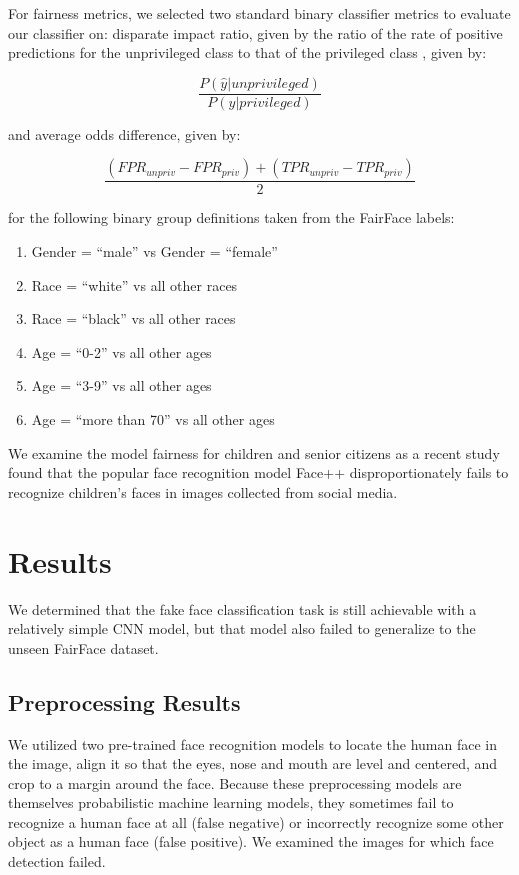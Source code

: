 \documentclass[11pt, letterpaper]{article}
\providecommand{\tightlist}{%
  \setlength{\itemsep}{0pt}\setlength{\parskip}{0pt}
}
\begin{document}
\begin{multicols}{2}
  For fairness metrics, we selected two standard binary classifier
  metrics to evaluate our classifier on: disparate impact ratio, given
  by the ratio of the rate of positive predictions for the
  unprivileged class to that of the privileged class
  \cite{fairMLHealth}, given by:

  $$\frac{P(\hat{y}|unprivileged)}{P(\hat{y}|privileged)}$$

  and average odds difference, given by:

  $$\frac{(FPR_{unpriv} - FPR_{priv}) + (TPR_{unpriv} - TPR_{priv})}{2}$$

  for the following binary group definitions taken from the FairFace
  labels:

  \begin{enumerate}
    \tightlist
  \item Gender = ``male'' vs Gender = ``female''
  \item Race = ``white'' vs all other races
  \item Race = ``black'' vs all other races
  \item Age = ``0-2'' vs all other ages
  \item Age = ``3-9'' vs all other ages
  \item Age = ``more than 70'' vs all other ages
  \end{enumerate}

  We examine the model fairness for children and senior citizens as a recent
  study \cite{9156262} found that the popular face recognition model Face++
  disproportionately fails to recognize children's faces in images collected
  from social media.

  \section{Results}

  We determined that the fake face classification task is
  still achievable with a relatively simple CNN model, but that model also
  failed to generalize to the unseen FairFace dataset.

  \subsection{Preprocessing Results}

  We utilized two pre-trained face recognition models to locate the human face
  in the image, align it so that the eyes, nose and mouth are level and
  centered, and crop to a margin around the face. Because these preprocessing
  models are themselves probabilistic machine learning models, they sometimes
  fail to recognize a human face at all (false negative) or incorrectly
  recognize some other object as a human face (false positive). We examined the
  images for which face detection failed.


\end{multicols}
\end{document}
